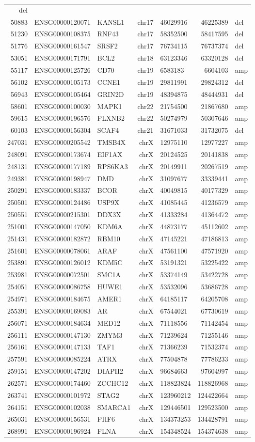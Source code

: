 \documentclass[]{article}
\begin{document}
\begin{longtable}[]{@{}rrlrlrl@{}}
del\tabularnewline
50883 & ENSG00000120071 & KANSL1 & chr17 & 46029916 & 46225389 &
del\tabularnewline
51230 & ENSG00000108375 & RNF43 & chr17 & 58352500 & 58417595 &
del\tabularnewline
51776 & ENSG00000161547 & SRSF2 & chr17 & 76734115 & 76737374 &
del\tabularnewline
53051 & ENSG00000171791 & BCL2 & chr18 & 63123346 & 63320128 &
del\tabularnewline
55117 & ENSG00000125726 & CD70 & chr19 & 6583183 & 6604103 &
amp\tabularnewline
56102 & ENSG00000105173 & CCNE1 & chr19 & 29811991 & 29824312 &
del\tabularnewline
56943 & ENSG00000105464 & GRIN2D & chr19 & 48394875 & 48444931 &
del\tabularnewline
58601 & ENSG00000100030 & MAPK1 & chr22 & 21754500 & 21867680 &
amp\tabularnewline
59615 & ENSG00000196576 & PLXNB2 & chr22 & 50274979 & 50307646 &
amp\tabularnewline
60103 & ENSG00000156304 & SCAF4 & chr21 & 31671033 & 31732075 &
del\tabularnewline
247031 & ENSG00000205542 & TMSB4X & chrX & 12975110 & 12977227 &
amp\tabularnewline
248091 & ENSG00000173674 & EIF1AX & chrX & 20124525 & 20141838 &
amp\tabularnewline
248131 & ENSG00000177189 & RPS6KA3 & chrX & 20149911 & 20267519 &
amp\tabularnewline
249381 & ENSG00000198947 & DMD & chrX & 31097677 & 33339441 &
amp\tabularnewline
250291 & ENSG00000183337 & BCOR & chrX & 40049815 & 40177329 &
amp\tabularnewline
250501 & ENSG00000124486 & USP9X & chrX & 41085445 & 41236579 &
amp\tabularnewline
250551 & ENSG00000215301 & DDX3X & chrX & 41333284 & 41364472 &
amp\tabularnewline
251001 & ENSG00000147050 & KDM6A & chrX & 44873177 & 45112602 &
amp\tabularnewline
251431 & ENSG00000182872 & RBM10 & chrX & 47145221 & 47186813 &
amp\tabularnewline
251601 & ENSG00000078061 & ARAF & chrX & 47561100 & 47571920 &
amp\tabularnewline
253891 & ENSG00000126012 & KDM5C & chrX & 53191321 & 53225422 &
amp\tabularnewline
253981 & ENSG00000072501 & SMC1A & chrX & 53374149 & 53422728 &
amp\tabularnewline
254051 & ENSG00000086758 & HUWE1 & chrX & 53532096 & 53686728 &
amp\tabularnewline
254971 & ENSG00000184675 & AMER1 & chrX & 64185117 & 64205708 &
amp\tabularnewline
255391 & ENSG00000169083 & AR & chrX & 67544021 & 67730619 &
amp\tabularnewline
256071 & ENSG00000184634 & MED12 & chrX & 71118556 & 71142454 &
amp\tabularnewline
256111 & ENSG00000147130 & ZMYM3 & chrX & 71239624 & 71255146 &
amp\tabularnewline
256161 & ENSG00000147133 & TAF1 & chrX & 71366239 & 71532374 &
amp\tabularnewline
257591 & ENSG00000085224 & ATRX & chrX & 77504878 & 77786233 &
amp\tabularnewline
259151 & ENSG00000147202 & DIAPH2 & chrX & 96684663 & 97604997 &
amp\tabularnewline
262571 & ENSG00000174460 & ZCCHC12 & chrX & 118823824 & 118826968 &
amp\tabularnewline
263741 & ENSG00000101972 & STAG2 & chrX & 123960212 & 124422664 &
amp\tabularnewline
264151 & ENSG00000102038 & SMARCA1 & chrX & 129446501 & 129523500 &
amp\tabularnewline
265031 & ENSG00000156531 & PHF6 & chrX & 134373253 & 134428791 &
amp\tabularnewline
268991 & ENSG00000196924 & FLNA & chrX & 154348524 & 154374638 &
amp\tabularnewline
\bottomrule
\end{longtable}
\end{document}
